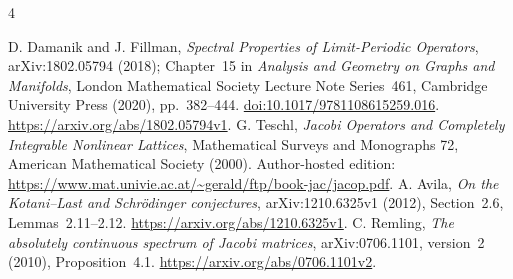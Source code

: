 \documentclass[11pt,a4paper]{article}
\numberwithin{equation}{section}
\theoremstyle{remark}
\begin{document}
\begin{thebibliography}{4}
\raggedright
{}
D. Damanik and J. Fillman,
\emph{Spectral Properties of Limit-Periodic Operators},
arXiv:1802.05794 (2018); Chapter~15 in
\emph{Analysis and Geometry on Graphs and Manifolds},
London Mathematical Society Lecture Note Series~461,
Cambridge University Press (2020), pp.~382--444.
\href{https://doi.org/10.1017/9781108615259.016}{doi:10.1017/9781108615259.016}.
\url{https://arxiv.org/abs/1802.05794v1}.
G. Teschl,
\emph{Jacobi Operators and Completely Integrable Nonlinear Lattices},
Mathematical Surveys and Monographs 72,
American Mathematical Society (2000).
Author-hosted edition:
\url{https://www.mat.univie.ac.at/~gerald/ftp/book-jac/jacop.pdf}.
A. Avila,
\emph{On the Kotani--Last and Schr\"odinger conjectures},
arXiv:1210.6325v1 (2012), Section~2.6, Lemmas~2.11--2.12.
\url{https://arxiv.org/abs/1210.6325v1}.
C. Remling,
\emph{The absolutely continuous spectrum of Jacobi matrices},
arXiv:0706.1101, version~2 (2010), Proposition~4.1.
\url{https://arxiv.org/abs/0706.1101v2}.
\end{thebibliography}
\end{document}
